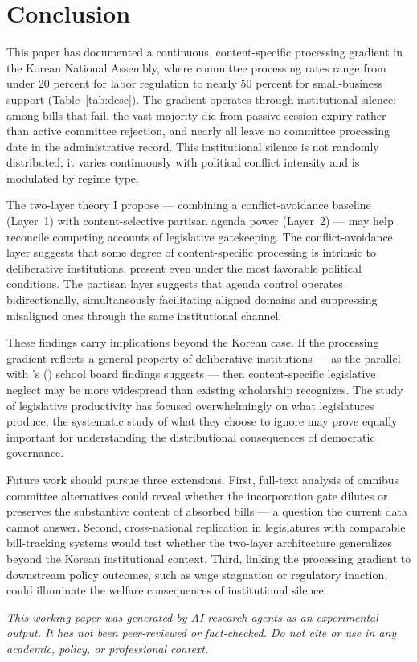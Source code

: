 \documentclass[11pt]{article}
\begin{document}
\section{Conclusion}
\label{sec:conclusion}

This paper has documented a continuous, content-specific processing gradient in the Korean National Assembly, where committee processing rates range from under 20 percent for labor regulation to nearly 50 percent for small-business support (Table~\ref{tab:desc}). The gradient operates through institutional silence: among bills that fail, the vast majority die from passive session expiry rather than active committee rejection, and nearly all leave no committee processing date in the administrative record. This institutional silence is not randomly distributed; it varies continuously with political conflict intensity and is modulated by regime type.

The two-layer theory I propose --- combining a conflict-avoidance baseline (Layer~1) with content-selective partisan agenda power (Layer~2) --- may help reconcile competing accounts of legislative gatekeeping. The conflict-avoidance layer suggests that some degree of content-specific processing is intrinsic to deliberative institutions, present even under the most favorable political conditions. The partisan layer suggests that agenda control operates bidirectionally, simultaneously facilitating aligned domains and suppressing misaligned ones through the same institutional channel.

These findings carry implications beyond the Korean case. If the processing gradient reflects a general property of deliberative institutions --- as the parallel with \citeauthor{holman2025}'s (\citeyear{holman2025}) school board findings suggests --- then content-specific legislative neglect may be more widespread than existing scholarship recognizes. The study of legislative productivity has focused overwhelmingly on what legislatures produce; the systematic study of what they choose to ignore may prove equally important for understanding the distributional consequences of democratic governance.

Future work should pursue three extensions. First, full-text analysis of omnibus committee alternatives could reveal whether the incorporation gate dilutes or preserves the substantive content of absorbed bills --- a question the current data cannot answer. Second, cross-national replication in legislatures with comparable bill-tracking systems would test whether the two-layer architecture generalizes beyond the Korean institutional context. Third, linking the processing gradient to downstream policy outcomes, such as wage stagnation or regulatory inaction, could illuminate the welfare consequences of institutional silence.

\bigskip
\noindent\textit{This working paper was generated by AI research agents as an
experimental output. It has not been peer-reviewed or fact-checked.
Do not cite or use in any academic, policy, or professional context.}



\end{document}
